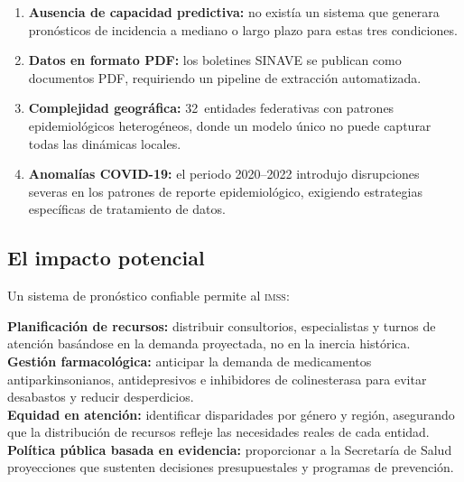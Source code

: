 \documentclass[12pt, letterpaper]{article}
\newenvironment{insightbox}[1][]{\par\medskip\begin{lrbox}{\boxcontents}\begin{minipage}{\dimexpr\textwidth-12pt}\setlength{\emergencystretch}{5em}\setlength{\parskip}{6pt}}{\end{minipage}\end{lrbox}\noindent\colorbox{lightgreen}{\usebox{\boxcontents}}\par\medskip}
\newcommand{\imss}{\textnormal{\textsc{imss}}}
\begin{document}
\begin{enumerate}
  \item \textbf{Ausencia de capacidad predictiva:} no existía un sistema que generara pronósticos de incidencia a mediano o largo plazo para estas tres condiciones.
  \item \textbf{Datos en formato PDF:} los boletines SINAVE se publican como documentos PDF, requiriendo un pipeline de extracción automatizada.
  \item \textbf{Complejidad geográfica:} 32~entidades federativas con patrones epidemiológicos heterogéneos, donde un modelo único no puede capturar todas las dinámicas locales.
  \item \textbf{Anomalías COVID-19:} el periodo 2020--2022 introdujo disrupciones severas en los patrones de reporte epidemiológico, exigiendo estrategias específicas de tratamiento de datos.
\end{enumerate}

\subsection{El impacto potencial}

Un sistema de pronóstico confiable permite al \imss{}:

\begin{insightbox}
\textbf{Planificación de recursos:} distribuir consultorios, especialistas y turnos de atención basándose en la demanda proyectada, no en la inercia histórica.\\[0.3cm]
\textbf{Gestión farmacológica:} anticipar la demanda de medicamentos antiparkinsonianos, antidepresivos e inhibidores de colinesterasa para evitar desabastos y reducir desperdicios.\\[0.3cm]
\textbf{Equidad en atención:} identificar disparidades por género y región, asegurando que la distribución de recursos refleje las necesidades reales de cada entidad.\\[0.3cm]
\textbf{Política pública basada en evidencia:} proporcionar a la Secretaría de Salud proyecciones que sustenten decisiones presupuestales y programas de prevención.
\end{insightbox}
\end{document}
